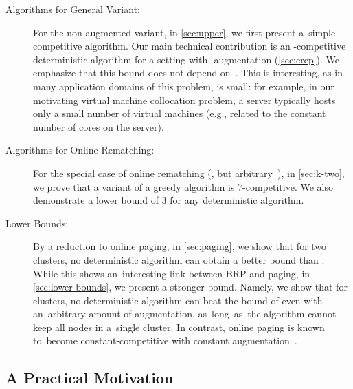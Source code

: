 \documentclass{siamart190516}
\begin{document}
\begin{description}

\item[Algorithms for General Variant:]
For the non-augmented variant, in \cref{sec:upper}, we first present a~simple
-competitive algorithm. Our main technical contribution
is an -competitive deterministic algorithm
 for a setting with -augmentation (\cref{sec:crep}).
We emphasize that this bound does not depend on~. This is interesting,
as in many application domains of this problem,  is small: for example, in
our motivating virtual machine collocation problem, a server typically hosts
only a small number of virtual machines (e.g., related to the constant number
of cores on the server).

\item[Algorithms for Online Rematching:]
For the special case of online rematching (, but arbitrary~), in
\cref{sec:k-two}, we prove that a variant of a greedy algorithm is
7-competitive. We also demonstrate a lower bound of 3 for any deterministic
algorithm.

\item[Lower Bounds:]
By a reduction to online paging, in \cref{sec:paging}, we show that
for two clusters, no deterministic algorithm can obtain a better bound than
. While this shows an~interesting link between BRP and paging, in
\cref{sec:lower-bounds}, we present a stronger bound. Namely, we
show that for  clusters, no deterministic algorithm can beat the
bound of  even with an~arbitrary amount of augmentation, as~long~as~the
algorithm cannot keep all nodes in a~single cluster. In contrast, online
paging is known to~become constant-competitive with constant
augmentation~\cite{SleTar85}.

\end{description}


\subsection{A Practical Motivation}
\end{document}
